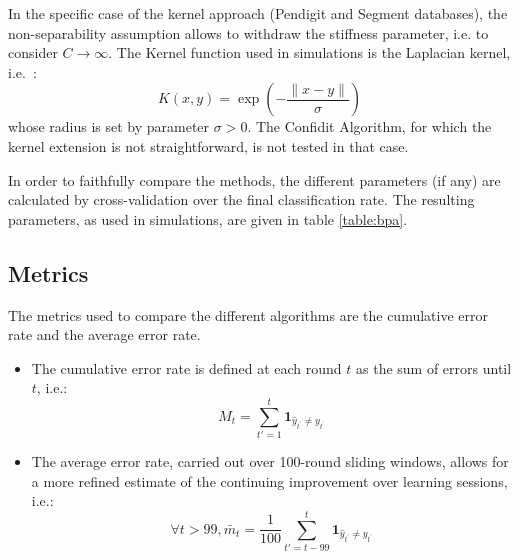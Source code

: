 \documentclass[preprint,12pt,authoryear]{elsarticle}
\begin{document}

In the specific case of the kernel approach (Pendigit and Segment databases), the non-separability assumption allows to withdraw the stiffness parameter, i.e. to consider $C \rightarrow \infty$. The Kernel function used in simulations is the Laplacian kernel, i.e.~:
\[K(x,y) = \exp{\left(-\frac{\parallel{x-y}\parallel}{\sigma}\right)}\]
whose radius is set by parameter $\sigma > 0$.
The Confidit Algorithm, for which the kernel extension is not straightforward, is not tested in that case.


In order to faithfully compare the methods, the different parameters (if any) are calculated by cross-validation over the final classification rate. The resulting parameters, as used in simulations, are given in table \ref{table:bpa}. 

\subsection{Metrics}


The metrics used to compare the different algorithms are the cumulative error rate and the average error rate. 
\begin{itemize}
\item The cumulative error rate is defined at each round $t$ as the sum of errors until $t$, i.e.:
$$M_t = \sum_{t'=1}^t \mathbf{1}_{\hat{y}_{t^\prime}\neq y_{t^\prime}} $$
\item The average error rate, carried out over 100-round sliding windows, allows for a more refined estimate of the continuing improvement over learning sessions, i.e.:
$$\forall t>99, \bar{m}_t = \frac{1}{100} \sum_{t'=t - 99}^t \mathbf{1}_{\hat{y}_{t^\prime}\neq y_{t^\prime}}$$
\end{itemize}
\end{document}
